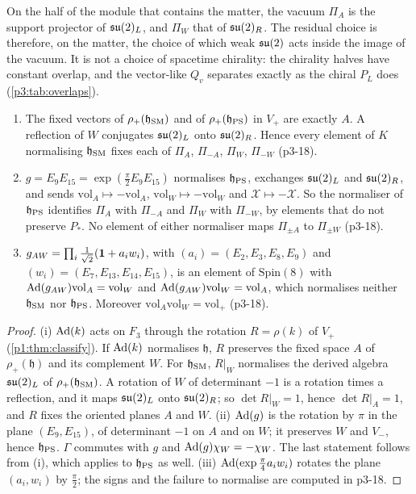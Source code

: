 On the half of the module that contains the matter, the vacuum $\Pi_A$ is the support projector of $\mathfrak{su}(2)_L$, and $\Pi_W$ that of $\mathfrak{su}(2)_R$. The residual choice is
therefore, on the matter, the choice of which weak $\mathfrak{su}(2)$ acts inside the image of the vacuum. It is not a choice of spacetime chirality: the chirality halves have
constant overlap, and the vector-like $Q_v$ separates exactly as the chiral $P_L$ does (\cref{p3:tab:overlaps}).

\begin{proposition}
\label{p3:prop:normaliser}
\begin{enumerate}[label=(\roman*),leftmargin=2.2em]
\item The fixed vectors of $\rho_+(\mathfrak h_{\rm SM})$ and of $\rho_+(\mathfrak h_{\rm PS})$ in $V_+$ are exactly $A$. A reflection of $W$ conjugates $\mathfrak{su}(2)_L$ onto $\mathfrak{su}(2)_R$.
Hence every element of $K$ normalising $\mathfrak h_{\rm SM}$ fixes each of $\Pi_A$, $\Pi_{-A}$, $\Pi_W$, $\Pi_{-W}$ (p3-18).
\item $g=E_9E_{15}=\exp(\tfrac\pi2E_9E_{15})$ normalises $\mathfrak h_{\rm PS}$, exchanges $\mathfrak{su}(2)_L$ and $\mathfrak{su}(2)_R$, and sends $\mathrm{vol}_A\mapsto-\mathrm{vol}_A$,
$\mathrm{vol}_W\mapsto-\mathrm{vol}_W$ and $\mathcal X\mapsto-\mathcal X$. So the normaliser of $\mathfrak h_{\rm PS}$ identifies $\Pi_A$ with $\Pi_{-A}$ and $\Pi_W$ with $\Pi_{-W}$, by
elements that do not preserve $P_*$. No element of either normaliser maps $\Pi_{\pm A}$ to $\Pi_{\pm W}$ (p3-18).
\item $g_{AW}=\prod_i\tfrac1{\sqrt2}(\mathbf 1+a_iw_i)$, with $(a_i)=(E_2,E_3,E_8,E_9)$ and $(w_i)=(E_7,E_{13},E_{14},E_{15})$, is an element of $\mathrm{Spin}(8)$ with
$\operatorname{Ad}(g_{AW})\mathrm{vol}_A=\mathrm{vol}_W$ and $\operatorname{Ad}(g_{AW})\mathrm{vol}_W=\mathrm{vol}_A$, which normalises neither $\mathfrak h_{\rm SM}$ nor $\mathfrak h_{\rm PS}$. Moreover
$\mathrm{vol}_A\mathrm{vol}_W=\mathrm{vol}_+$ (p3-18).
\end{enumerate}
\end{proposition}

\begin{proof}
(i) $\operatorname{Ad}(k)$ acts on $F_3$ through the rotation $R=\rho(k)$ of $V_+$ (\cref{p1:thm:classify}). If $\operatorname{Ad}(k)$ normalises $\mathfrak h$, $R$ preserves the fixed space $A$ of
$\rho_+(\mathfrak h)$ and its complement $W$. For $\mathfrak h_{\rm SM}$, $R|_W$ normalises the derived algebra $\mathfrak{su}(2)_L$ of $\rho_+(\mathfrak h_{\rm SM})$. A rotation of $W$ of
determinant $-1$ is a rotation times a reflection, and it maps $\mathfrak{su}(2)_L$ onto $\mathfrak{su}(2)_R$; so $\det R|_W=1$, hence $\det R|_A=1$, and $R$ fixes the oriented planes $A$ and $W$. (ii)
$\operatorname{Ad}(g)$ is the rotation by $\pi$ in the plane $(E_9,E_{15})$, of determinant $-1$ on $A$ and on $W$; it preserves $W$ and $V_-$, hence $\mathfrak h_{\rm PS}$. $\Gamma$ commutes
with $g$ and $\operatorname{Ad}(g)\chi_W=-\chi_W$. The last statement follows from (i), which applies to $\mathfrak h_{\rm PS}$ as well. (iii) $\operatorname{Ad}(\exp\tfrac\pi4a_iw_i)$ rotates the plane
$(a_i,w_i)$ by $\tfrac\pi2$; the signs and the failure to normalise are computed in p3-18.
\end{proof}

